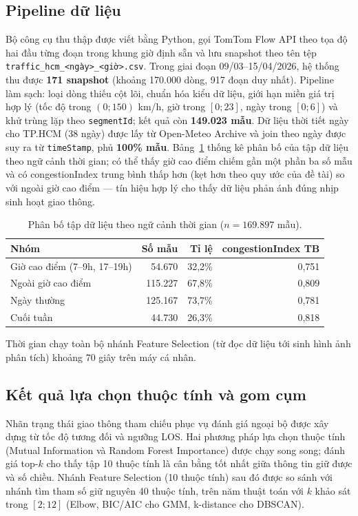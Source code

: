 \subsection{Pipeline dữ liệu}
Bộ công cụ thu thập được viết bằng Python, gọi TomTom Flow API theo tọa độ hai đầu từng đoạn trong khung giờ định sẵn và lưu snapshot theo tên tệp \texttt{traffic\_hcm\_<ngày>\_<giờ>.csv}. Trong giai đoạn 09/03--15/04/2026, hệ thống thu được \textbf{171 snapshot} (khoảng 170.000 dòng, 917 đoạn duy nhất). Pipeline làm sạch: loại dòng thiếu cột lõi, chuẩn hóa kiểu dữ liệu, giới hạn miền giá trị hợp lý (tốc độ trong $(0;150)$ km/h, giờ trong $[0;23]$, ngày trong $[0;6]$) và khử trùng lặp theo \texttt{segmentId}; kết quả còn \textbf{149.023 mẫu}. Dữ liệu thời tiết ngày cho TP.HCM (38 ngày) được lấy từ Open-Meteo Archive và join theo ngày được suy ra từ \texttt{timeStamp}, phủ \textbf{100\% mẫu}. Bảng~\ref{tab:dist} thống kê phân bố của tập dữ liệu theo ngữ cảnh thời gian; có thể thấy giờ cao điểm chiếm gần một phần ba số mẫu và có congestionIndex trung bình thấp hơn (kẹt hơn theo quy ước của đề tài) so với ngoài giờ cao điểm --- tín hiệu hợp lý cho thấy dữ liệu phản ánh đúng nhịp sinh hoạt giao thông.

\begin{table}[h!]
\centering
\caption{Phân bố tập dữ liệu theo ngữ cảnh thời gian ($n = 169.897$ mẫu).}
\label{tab:dist}
\small
\begin{tabular}{lrrr}
\toprule
\textbf{Nhóm} & \textbf{Số mẫu} & \textbf{Tỉ lệ} & \textbf{congestionIndex TB}\\
\midrule
Giờ cao điểm (7--9h, 17--19h) & 54.670 & 32{,}2\% & 0{,}751\\
Ngoài giờ cao điểm & 115.227 & 67{,}8\% & 0{,}809\\
Ngày thường & 125.167 & 73{,}7\% & 0{,}781\\
Cuối tuần & 44.730 & 26{,}3\% & 0{,}818\\
\bottomrule
\end{tabular}
\end{table}

Thời gian chạy toàn bộ nhánh Feature Selection (từ đọc dữ liệu tới sinh hình ảnh phân tích) khoảng 70 giây trên máy cá nhân.

\subsection{Kết quả lựa chọn thuộc tính và gom cụm}
Nhãn trạng thái giao thông tham chiếu phục vụ đánh giá ngoại bộ được xây dựng từ tốc độ tương đối và ngưỡng LOS. Hai phương pháp lựa chọn thuộc tính (Mutual Information và Random Forest Importance) được chạy song song; đánh giá top-$k$ cho thấy tập 10 thuộc tính là cân bằng tốt nhất giữa thông tin giữ được và số chiều. Nhánh Feature Selection (10 thuộc tính) sau đó được so sánh với nhánh tìm tham số giữ nguyên 40 thuộc tính, trên năm thuật toán với $k$ khảo sát trong $[2;12]$ (Elbow, BIC/AIC cho GMM, k-distance cho DBSCAN).

